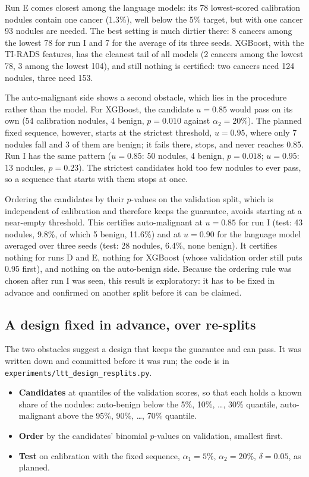 Run E comes closest among the language models: its 78 lowest-scored calibration nodules contain
one cancer (1.3\%), well below the 5\% target, but with one cancer 93 nodules are needed. The best
setting is much dirtier there: 8 cancers among the lowest 78 for run I and 7 for the average of its
three seeds. XGBoost, with the TI-RADS
features, has the cleanest tail of all models (2 cancers among the lowest 78, 3 among the lowest
104), and still nothing is certified: two cancers need 124 nodules, three need 153.

The auto-malignant side shows a second obstacle, which lies in the procedure rather than the
model. For XGBoost, the candidate $u = 0.85$ would pass on its own (54 calibration nodules, 4
benign, $p = 0.010$ against $\alpha_2 = 20\%$). The planned fixed sequence, however, starts at the
strictest threshold, $u = 0.95$, where only 7 nodules fall and 3 of them are benign; it fails
there, stops, and never reaches 0.85. Run I has the same pattern ($u = 0.85$: 50 nodules, 4
benign, $p = 0.018$; $u = 0.95$: 13 nodules, $p = 0.23$). The strictest candidates hold too few
nodules to ever pass, so a sequence that starts with them stops at once.

Ordering the candidates by their $p$-values on the validation split, which is independent of
calibration and therefore keeps the guarantee, avoids starting at a near-empty threshold. This
certifies auto-malignant at $u = 0.85$ for run I (test: 43 nodules, 9.8\%, of which 5 benign,
11.6\%) and at $u = 0.90$ for the language model averaged over three seeds (test: 28 nodules,
6.4\%, none benign). It certifies nothing for runs D and E, nothing for XGBoost (whose validation
order still puts 0.95 first), and nothing on the auto-benign side. Because the ordering rule was
chosen after run I was seen, this result is exploratory: it has to be fixed in advance and
confirmed on another split before it can be claimed.

\subsection{A design fixed in advance, over re-splits}
\label{sec:results-ltt-design}

The two obstacles suggest a design that keeps the guarantee and can pass. It was written down and
committed before it was run; the code is in
\texttt{experiments/\allowbreak ltt\_design\_resplits.py}.

\begin{itemize}
  \item \textbf{Candidates} at quantiles of the validation scores, so that each holds a known
        share of the nodules: auto-benign below the 5\%, 10\%, \dots, 30\% quantile, auto-malignant
        above the 95\%, 90\%, \dots, 70\% quantile.
  \item \textbf{Order} by the candidates' binomial $p$-values on validation, smallest first.
  \item \textbf{Test} on calibration with the fixed sequence, $\alpha_1 = 5\%$,
        $\alpha_2 = 20\%$, $\delta = 0.05$, as planned.
\end{itemize}

